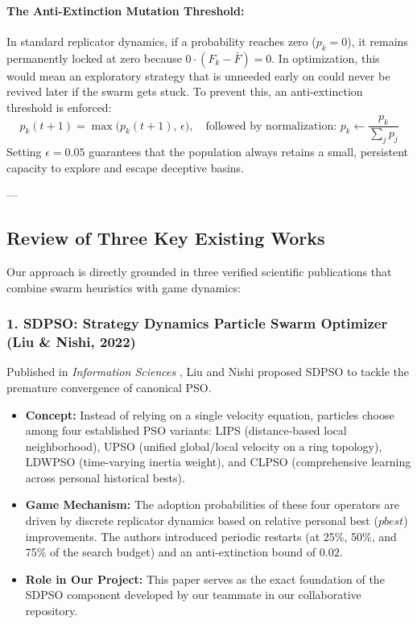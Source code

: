 \paragraph{The Anti-Extinction Mutation Threshold:}
In standard replicator dynamics, if a probability reaches zero ($p_k = 0$), it remains permanently locked at zero because $0 \cdot (F_k - \bar{F}) = 0$. In optimization, this would mean an exploratory strategy that is unneeded early on could never be revived later if the swarm gets stuck. To prevent this, an anti-extinction threshold is enforced:
\begin{equation}
    p_k(t+1) = \max\Big(p_k(t+1),\, \epsilon\Big), \quad \text{followed by normalization: } p_k \leftarrow \frac{p_k}{\sum_j p_j}
\end{equation}
Setting $\epsilon = 0.05$ guarantees that the population always retains a small, persistent capacity to explore and escape deceptive basins.

---

\subsection{Review of Three Key Existing Works}

Our approach is directly grounded in three verified scientific publications that combine swarm heuristics with game dynamics:

\subsubsection{1. SDPSO: Strategy Dynamics Particle Swarm Optimizer (Liu \& Nishi, 2022)}
Published in \textit{Information Sciences} \cite{liu2022strategy}, Liu and Nishi proposed SDPSO to tackle the premature convergence of canonical PSO.
\begin{itemize}
    \item \textbf{Concept:} Instead of relying on a single velocity equation, particles choose among four established PSO variants: LIPS (distance-based local neighborhood), UPSO (unified global/local velocity on a ring topology), LDWPSO (time-varying inertia weight), and CLPSO (comprehensive learning across personal historical bests).
    \item \textbf{Game Mechanism:} The adoption probabilities of these four operators are driven by discrete replicator dynamics based on relative personal best ($pbest$) improvements. The authors introduced periodic restarts (at 25\%, 50\%, and 75\% of the search budget) and an anti-extinction bound of $0.02$.
    \item \textbf{Role in Our Project:} This paper serves as the exact foundation of the SDPSO component developed by our teammate in our collaborative repository.
\end{itemize}

